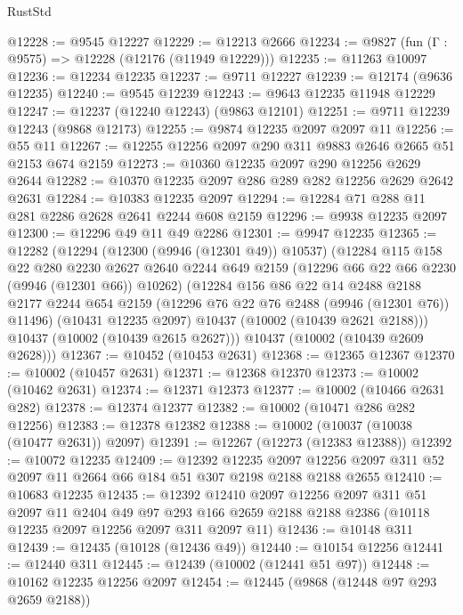 \begin{lexlean}{RustStd}
\begin{coremodule}
@12228 := @9545 @12227
@12229 := @12213 @2666
@12234 := @9827 (fun (Γ : @9575) => @12228 (@12176 (@11949 @12229)))
@12235 := @11263 @10097
@12236 := @12234 @12235
@12237 := @9711 @12227
@12239 := @12174 (@9636 @12235)
@12240 := @9545 @12239
@12243 := @9643 @12235 @11948 @12229
@12247 := @12237 (@12240 @12243) (@9863 @12101)
@12251 := @9711 @12239 @12243 (@9868 @12173)
@12255 := @9874 @12235 @2097 @2097 @11
@12256 := @55 @11
@12267 := @12255 @12256 @2097 @290 @311 @9883 @2646 @2665 @51 @2153 @674 @2159
@12273 := @10360 @12235 @2097 @290 @12256 @2629 @2644
@12282 := @10370 @12235 @2097 @286 @289 @282 @12256 @2629 @2642 @2631
@12284 := @10383 @12235 @2097
@12294 := @12284 @71 @288 @11 @281 @2286 @2628 @2641 @2244 @608 @2159
@12296 := @9938 @12235 @2097
@12300 := @12296 @49 @11 @49 @2286
@12301 := @9947 @12235
@12365 := @12282
    (@12294
      (@12300 (@9946 (@12301 @49)) @10537)
      (@12284
        @115
        @158
        @22
        @280
        @2230
        @2627
        @2640
        @2244
        @649
        @2159
        (@12296 @66 @22 @66 @2230 (@9946 (@12301 @66)) @10262)
        (@12284
          @156
          @86
          @22
          @14
          @2488
          @2188
          @2177
          @2244
          @654
          @2159
          (@12296 @76 @22 @76 @2488 (@9946 (@12301 @76)) @11496)
          (@10431 @12235 @2097)
          @10437
          (@10002 (@10439 @2621 @2188)))
        @10437
        (@10002 (@10439 @2615 @2627)))
      @10437
      (@10002 (@10439 @2609 @2628)))
@12367 := @10452 (@10453 @2631)
@12368 := @12365 @12367
@12370 := @10002 (@10457 @2631)
@12371 := @12368 @12370
@12373 := @10002 (@10462 @2631)
@12374 := @12371 @12373
@12377 := @10002 (@10466 @2631 @282)
@12378 := @12374 @12377
@12382 := @10002 (@10471 @286 @282 @12256)
@12383 := @12378 @12382
@12388 := @10002 (@10037 (@10038 (@10477 @2631)) @2097)
@12391 := @12267 (@12273 (@12383 @12388))
@12392 := @10072 @12235
@12409 := @12392
    @12235
    @2097
    @12256
    @2097
    @311
    @52
    @2097
    @11
    @2664
    @66
    @184
    @51
    @307
    @2198
    @2188
    @2188
    @2655
@12410 := @10683 @12235
@12435 := @12392
    @12410
    @2097
    @12256
    @2097
    @311
    @51
    @2097
    @11
    @2404
    @49
    @97
    @293
    @166
    @2659
    @2188
    @2188
    @2386
    (@10118 @12235 @2097 @12256 @2097 @311 @2097 @11)
@12436 := @10148 @311
@12439 := @12435 (@10128 (@12436 @49))
@12440 := @10154 @12256
@12441 := @12440 @311
@12445 := @12439 (@10002 (@12441 @51 @97))
@12448 := @10162 @12235 @12256 @2097
@12454 := @12445 (@9868 (@12448 @97 @293 @2659 @2188))

\end{coremodule}
\end{lexlean}
